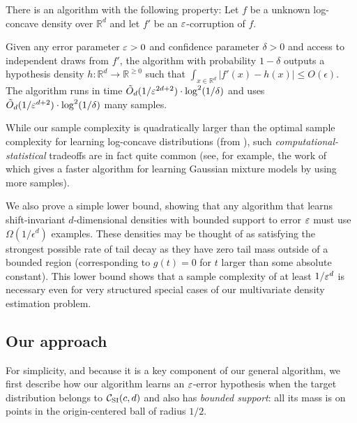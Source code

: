 \begin{theorem} \label{thm:log-concave-intro}
There is an algorithm with the following property:  Let $f$ be a unknown log-concave density over $\mathbb{R}^d$ and let $f'$ be an $\varepsilon$-corruption of $f$. Given any error parameter $\varepsilon>0$ and confidence parameter $\delta > 0$ and access to independent draws from $f'$, the algorithm with probability $1-\delta$ outputs a hypothesis density ${h}:\mathbb{R}^d \rightarrow \mathbb{R}^{\geq 0}$ such that $\int_{x \in \mathbb{R}^d} |f'(x) - {h}(x)| \le O(\epsilon)$.  The algorithm runs in time $\tilde{O}_d(1/\varepsilon^{2d+2}) \cdot \log^2(1/\delta)$ and uses $\tilde{O}_d(1/\varepsilon^{d+2}) \cdot \log^2(1/\delta)$ many samples.  
\end{theorem}

While our sample complexity is quadratically larger than the optimal sample complexity for learning log-concave distributions (from \citep{diakonikolas2016learning}), such \emph{computational-statistical} tradeoffs are in fact quite common (see, for example, the work of~\cite{bhaskara2015sparse} which gives a faster algorithm for learning Gaussian mixture models by using more samples).

\medskip
{}  We also prove a simple lower bound,
showing that any algorithm that learns shift-invariant $d$-dimensional
densities with bounded support to error $\varepsilon$ must use
$\Omega\left(1/\epsilon^d\right)$ examples.  These densities may be
thought of as satisfying the strongest possible rate of tail decay as
they have zero tail mass outside of a bounded region (corresponding to
$g(t)=0$ for $t$ larger than some absolute constant).  This lower
bound shows that a sample complexity of at least $1/\varepsilon^d$ is
necessary even for very structured special cases of our multivariate
density estimation problem.



\subsection{Our approach} \label{sec:approach}

For simplicity, and because it is a key component of our general algorithm, we first describe how our algorithm learns an $\varepsilon$-error hypothesis when the target distribution belongs to ${\mathcal C}_{\mathrm{SI}}(c,d)$ and 
also has \emph{bounded support}:  all its mass is on points in the origin-centered ball of radius $1/2$.  

